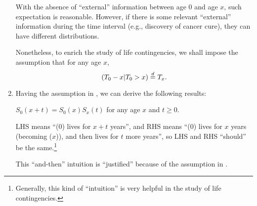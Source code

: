 \begin{enumerate}
With the absence of ``external'' information between age 0 and age \(x\), such
expectation is reasonable. However, if there is some relevant ``external''
information during the time interval (e.g., discovery of cancer cure), they
can have different distributions.

Nonetheless, to enrich the study of life contingencies, we shall impose the
assumption that for any age \(x\),
\[
(T_0-x|T_0>x)\overset{d}= T_x.
\]

\item Having the assumption in , we can derive the
following results:
\begin{proposition}
\label{prp:chain-surv}
\(S_0(x+t)=S_0(x)S_x(t)\) for any age \(x\) and \(t\ge 0\).
\end{proposition}

\begin{intuition}
LHS means ``(0) lives for \(x+t\) years'', and RHS means ``(0) lives for \(x\)
years (becoming (\(x\))), and then lives for \(t\) more years'', so LHS and RHS
``should'' be the same.\footnote{Generally, this kind of ``intuition'' is very helpful in the study of
life contingencies.}

\end{intuition}

\begin{note}
This ``and-then'' intuition is ``justified'' because of the assumption in
.
\end{note}


\end{enumerate}
